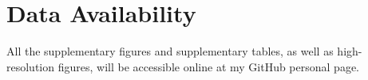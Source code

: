 
% 

{
\chapter*{Data Availability}
\label{data_availability}
}

All the supplementary figures and supplementary tables, as well as high-resolution figures, will be accessible online at my GitHub personal page.

% 